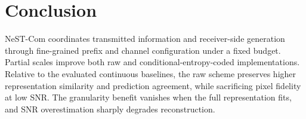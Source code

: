 \documentclass[journal]{IEEEtran}
\begin{document}

\section{Conclusion}
NeST-Com coordinates transmitted information and receiver-side generation through fine-grained prefix and channel configuration under a fixed budget. Partial scales improve both raw and conditional-entropy-coded implementations. Relative to the evaluated continuous baselines, the raw scheme preserves higher representation similarity and prediction agreement, while sacrificing pixel fidelity at low SNR. The granularity benefit vanishes when the full representation fits, and SNR overestimation sharply degrades reconstruction.
\end{document}
